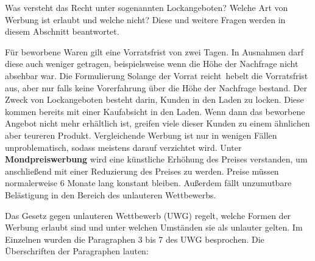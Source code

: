 Was versteht das Recht unter sogenannten \ql Lockangeboten\qr? Welche Art von Werbung ist erlaubt und welche nicht? Diese und weitere Fragen werden in diesem Abschnitt beantwortet. 

Für beworbene Waren gilt eine Vorratsfrist von zwei Tagen. In Ausnahmen darf diese auch weniger getragen, beispielsweise wenn die Höhe der Nachfrage nicht absehbar war. Die Formulierung \ql Solange der Vorrat reicht\qr\ hebelt die Vorratsfrist aus, aber nur falls keine Vorerfahrung über die Höhe der Nachfrage bestand. Der Zweck von Lockangeboten besteht darin, Kunden in den Laden zu locken. Diese kommen bereits mit einer Kaufabsicht in den Laden. Wenn dann das beworbene Angebot nicht mehr erhältlich ist, greifen viele dieser Kunden zu einem ähnlichen aber teureren Produkt. Vergleichende Werbung ist nur in wenigen Fällen unproblematisch, sodass meistens darauf verzichtet wird. Unter {\bf Mondpreiswerbung} wird eine künstliche Erhöhung des Preises verstanden, um anschließend mit einer Reduzierung des Preises zu werden. Preise müssen normalerweise 6 Monate lang konstant bleiben. Außerdem fällt unzumutbare Belästigung in den Bereich des unlauteren Wettbewerbs.

Das Gesetz gegen unlauteren Wettbewerb (UWG) regelt, welche Formen der Werbung erlaubt sind und unter welchen Umständen sie als unlauter gelten. Im Einzelnen wurden die Paragraphen 3 bis 7 des UWG besprochen. Die Überschriften der Paragraphen lauten:

